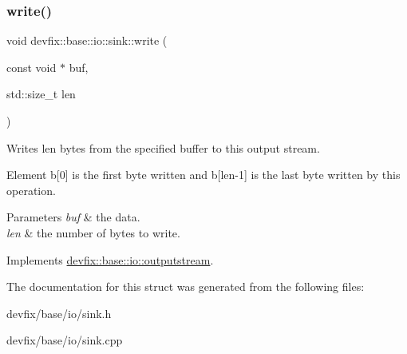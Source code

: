 \subsubsection{\texorpdfstring{write()}{write()}}
{\footnotesize\ttfamily void devfix\+::base\+::io\+::sink\+::write (\begin{DoxyParamCaption}\item[{const void $\ast$}]{buf,  }\item[{std\+::size\+\_\+t}]{len }\end{DoxyParamCaption})\hspace{0.3cm}{\ttfamily [virtual]}}



Writes len bytes from the specified buffer to this output stream. 

Element b\mbox{[}0\mbox{]} is the first byte written and b\mbox{[}len-\/1\mbox{]} is the last byte written by this operation.


\begin{DoxyParams}{Parameters}
{\em buf} & the data. \\
\hline
{\em len} & the number of bytes to write. \\
\hline
\end{DoxyParams}


Implements \hyperlink{structdevfix_1_1base_1_1io_1_1outputstream_ac7e5fcd6883c7c8f53356a4eb8284c00}{devfix\+::base\+::io\+::outputstream}.



The documentation for this struct was generated from the following files\+:\begin{DoxyCompactItemize}
\item 
devfix/base/io/sink.\+h\item 
devfix/base/io/sink.\+cpp\end{DoxyCompactItemize}

